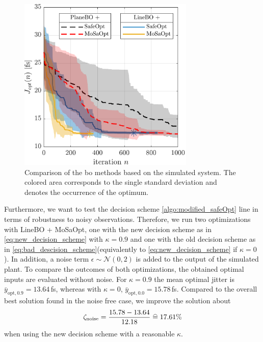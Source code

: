 \documentclass{ifacconf}
\newcommand{\linea}[1]{line\:{\footnotesize \textbf{(#1)}}}
\newcommand\equalhat{\mathrel{\stackon[1.5pt]{=}{\stretchto{%
    \scalerel*[\widthof{=}]{\wedge}{\rule{1ex}{3ex}}}{0.5ex}}}}
\begin{document}
\begin{figure}
    \centering
    \includegraphics[width = 8.4cm]{figs/Bo_Comparison.pdf}
    \caption{Comparison of the \gls{bo} methods based on the simulated system. The colored area corresponds to the single standard deviation and  denotes the occurrence of the optimum.}
    \label{fig:bo_comparison}
\end{figure}

Furthermore,  we want to test the decision scheme \cref{algo:modified_safeOpt} \linea{18} in terms of robustness to noisy observations. Therefore, we run two optimizations with LineBO + MoSaOpt, one with the new decision scheme as in \eqref{eq:new_decision_scheme} with \(\kappa=0.9\) and one with the old decision scheme as in \eqref{eq:bad_descision_scheme}(equivalently to \eqref{eq:new_decision_scheme} if \(\kappa = 0\)). In addition, a noise term \(\epsilon \sim \mathcal{N}(0,2)\) is added to the output of the simulated plant. To compare the outcomes of both optimizations, the obtained optimal inputs are evaluated without noise. For \(\kappa = 0.9\) the mean optimal jitter is \(\bar{y}_{\mathrm{opt},0.9}=13.64 \)\,\si{fs}, whereas with \(\kappa=0\), \(\bar{y}_{\mathrm{opt},0.0}=15.78 \)\,\si{\femto\second}. Compared to the overall best solution found in the noise free case, we improve the solution about
\begin{align}
    \zeta_\mathrm{noise} = \frac{15.78-13.64}{12.18} \equalhat 17.61\%
\end{align}
when using the new decision scheme with a reasonable \(\kappa\).
\end{document}
